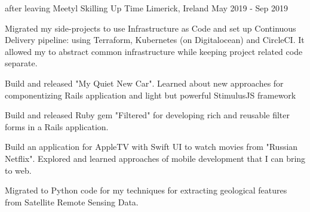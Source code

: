 


\begin{cventries}

  \cventry
    {after leaving Meetyl} %
    {Skilling Up Time} %
    {Limerick, Ireland} %
    {May 2019 - Sep 2019} %
    {
      \begin{cvitems} %
        \item {Migrated my side-projects to use Infrastructure as Code and set up Continuous Delivery pipeline: using Terraform, Kubernetes (on Digitalocean) and CircleCI. It allowed my to abstract common infrastructure while keeping project related code separate.}
        \item {Build and released "My Quiet New Car". Learned about new approaches for componentizing Rails application and light but powerful StimulusJS framework}
        \item {Build and released Ruby gem "Filtered" for developing rich and reusable filter forms in a Rails application.}
        \item {Build an application for AppleTV with Swift UI to watch movies from "Russian Netflix". Explored and learned approaches of mobile development that I can bring to web.}
        \item {Migrated to Python code for my techniques for extracting geological features from Satellite Remote Sensing Data.}
      \end{cvitems}
    }

\end{cventries}

